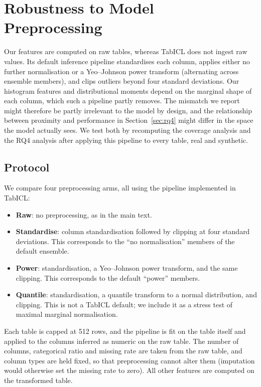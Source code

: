 \documentclass{article}
\begin{document}
\section{Robustness to Model Preprocessing}
\label{sec:preprocessing}

Our features are computed on raw tables, whereas TabICL does not ingest raw values.
Its default inference pipeline standardises each column, applies either no further normalisation or a Yeo--Johnson power transform (alternating across ensemble members), and clips outliers beyond four standard deviations.
Our histogram features and distributional moments depend on the marginal shape of each column, which such a pipeline partly removes.
The mismatch we report might therefore be partly irrelevant to the model by design, and the relationship between proximity and performance in Section~\ref{sec:rq4} might differ in the space the model actually sees.
We test both by recomputing the coverage analysis and the RQ4 analysis after applying this pipeline to every table, real and synthetic.

\subsection{Protocol}

We compare four preprocessing arms, all using the pipeline implemented in TabICL:
\begin{itemize}
    \item \textbf{Raw}: no preprocessing, as in the main text.
    \item \textbf{Standardise}: column standardisation followed by clipping at four standard deviations. This corresponds to the ``no normalisation'' members of the default ensemble.
    \item \textbf{Power}: standardisation, a Yeo--Johnson power transform, and the same clipping. This corresponds to the default ``power'' members.
    \item \textbf{Quantile}: standardisation, a quantile transform to a normal distribution, and clipping. This is not a TabICL default; we include it as a stress test of maximal marginal normalisation.
\end{itemize}
Each table is capped at 512 rows, and the pipeline is fit on the table itself and applied to the columns inferred as numeric on the raw table.
The number of columns, categorical ratio and missing rate are taken from the raw table, and column types are held fixed, so that preprocessing cannot alter them (imputation would otherwise set the missing rate to zero).
All other features are computed on the transformed table.
\end{document}
